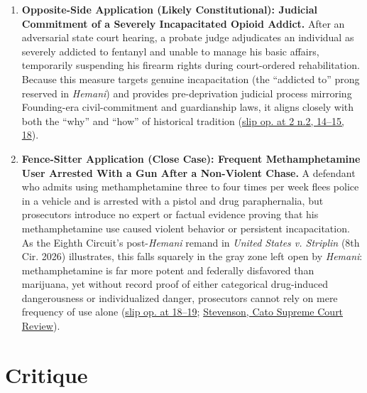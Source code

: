 \documentclass[12pt]{article}
\begin{document}
\begin{enumerate}
\item \textbf{Opposite-Side Application (Likely Constitutional): Judicial Commitment of a Severely Incapacitated Opioid Addict.} After an adversarial state court hearing, a probate judge adjudicates an individual as severely addicted to fentanyl and unable to manage his basic affairs, temporarily suspending his firearm rights during court-ordered rehabilitation. Because this measure targets genuine incapacitation (the ``addicted to'' prong reserved in \textit{Hemani}) and provides pre-deprivation judicial process mirroring Founding-era civil-commitment and guardianship laws, it aligns closely with both the ``why'' and ``how'' of historical tradition (\href{https://supreme.justia.com/cases/federal/us/608/24-1234/}{slip op. at 2 n.2, 14--15, 18}).

\item \textbf{Fence-Sitter Application (Close Case): Frequent Methamphetamine User Arrested With a Gun After a Non-Violent Chase.} A defendant who admits using methamphetamine three to four times per week flees police in a vehicle and is arrested with a pistol and drug paraphernalia, but prosecutors introduce no expert or factual evidence proving that his methamphetamine use caused violent behavior or persistent incapacitation. As the Eighth Circuit's post-\textit{Hemani} remand in \textit{United States v. Striplin} (8th Cir. 2026) illustrates, this falls squarely in the gray zone left open by \textit{Hemani}: methamphetamine is far more potent and federally disfavored than marijuana, yet without record proof of either categorical drug-induced dangerousness or individualized danger, prosecutors cannot rely on mere frequency of use alone (\href{https://supreme.justia.com/cases/federal/us/608/24-1234/}{slip op. at 18--19}; \href{https://www.cato.org/sites/cato.org/files/2026-09/2025-2026-Supreme-Court-Review-7.pdf}{Stevenson, Cato Supreme Court Review}).
\end{enumerate}

\section{Critique}
\end{document}
